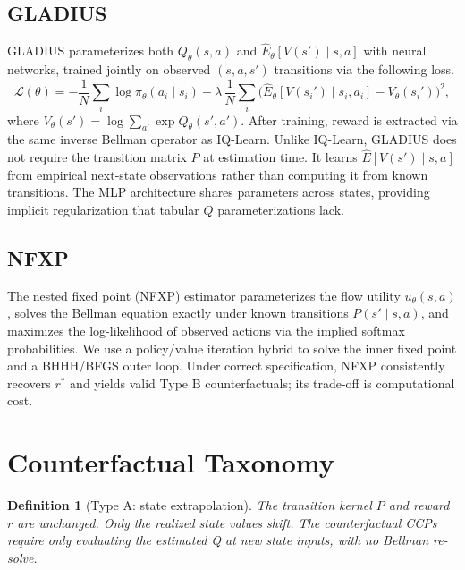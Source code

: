 \documentclass[11pt]{article}
\newtheorem{definition}[theorem]{Definition}
\begin{document}
\subsection{GLADIUS \citep{kang2025}}

GLADIUS parameterizes both $Q_\theta(s,a)$ and $\hat{E}_\theta[V(s') \mid s,a]$ with neural networks, trained jointly on observed $(s,a,s')$ transitions via the following loss.
\begin{equation}\label{eq:gladius}
\mathcal{L}(\theta) = -\frac{1}{N}\sum_{i}\log\pi_\theta(a_i \mid s_i)
  + \lambda\,\frac{1}{N}\sum_{i}\bigl(\hat{E}_\theta[V(s_i') \mid s_i,a_i] - V_\theta(s_i')\bigr)^{2},
\end{equation}
where $V_\theta(s') = \log\sum_{a'}\exp Q_\theta(s',a')$. After training, reward is extracted via the same inverse Bellman operator as IQ-Learn. Unlike IQ-Learn, GLADIUS does not require the transition matrix $P$ at estimation time. It learns $\hat{E}[V(s') \mid s, a]$ from empirical next-state observations rather than computing it from known transitions. The MLP architecture shares parameters across states, providing implicit regularization that tabular $Q$ parameterizations lack.

\subsection{NFXP \citep{rust1987}}

The nested fixed point (NFXP) estimator parameterizes the flow utility $u_\theta(s,a)$, solves the Bellman equation exactly under known transitions $P(s'\mid s,a)$, and maximizes the log-likelihood of observed actions via the implied softmax probabilities. We use a policy/value iteration hybrid to solve the inner fixed point and a BHHH/BFGS outer loop. Under correct specification, NFXP consistently recovers $r^*$ and yields valid Type B counterfactuals; its trade-off is computational cost.

\section{Counterfactual Taxonomy}

\begin{definition}[Type A: state extrapolation]
The transition kernel $P$ and reward $r$ are unchanged. Only the realized state values shift. The counterfactual CCPs require only evaluating the estimated Q at new state inputs, with no Bellman re-solve.
\end{definition}
\end{document}
